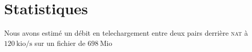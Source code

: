 \section{Statistiques}
Nous avons estimé un débit en telechargement entre deux pairs derrière \textsc{nat} à $120~\text{kio/s}$ sur un fichier de $698~\text{Mio}$

